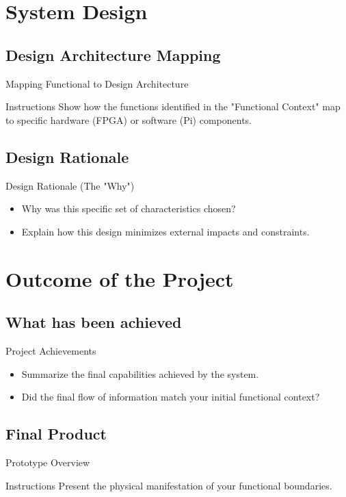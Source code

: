 \documentclass[aspectratio=169, 10pt, shadow]{beamer}
\begin{document}
\section{System Design}
\subsection{Design Architecture Mapping}
\begin{frame}{Mapping Functional to Design Architecture}
  \begin{block}{Instructions}
    Show how the functions identified in the "Functional Context" map to specific hardware (FPGA) or software (Pi) components.
  \end{block}
\end{frame}

\subsection{Design Rationale}
\begin{frame}{Design Rationale (The "Why")}
  \begin{itemize}
      \item Why was this specific set of characteristics chosen?
      \item Explain how this design minimizes external impacts and constraints.
  \end{itemize}
\end{frame}

\section{Outcome of the Project}
\subsection{What has been achieved}
\begin{frame}{Project Achievements}
  \begin{itemize}
      \item Summarize the final capabilities achieved by the system.
      \item Did the final flow of information match your initial functional context?
  \end{itemize}
\end{frame}

\subsection{Final Product}
\begin{frame}{Prototype Overview}
  \centering
  \begin{block}{Instructions}
    Present the physical manifestation of your functional boundaries.
  \end{block}
\end{frame}
\end{document}
